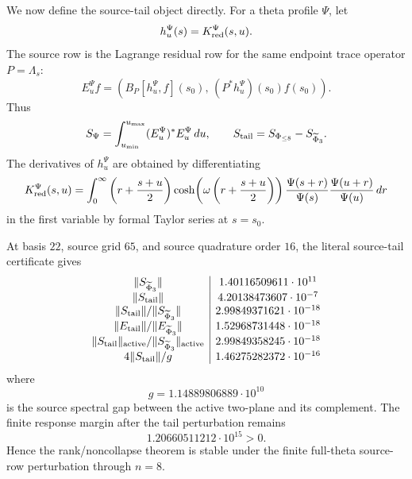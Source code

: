 \documentclass[11pt]{article}
\begin{document}
We now define the source-tail object directly.  For a theta profile \(\Psi\),
let
\[
  h_u^\Psi(s)=K_{\rm red}^\Psi(s,u).
\]
The source row is the Lagrange residual row for the same endpoint trace
operator \(P=\Lambda_s\):
\[
  E_u^\Psi f
  =
  \left(
    B_P[h_u^\Psi,f](s_0),\,
    (P^\ast h_u^\Psi)(s_0)f(s_0)
  \right).
\]
Thus
\[
  S_\Psi=\int_{u_{\min}}^{u_{\max}}(E_u^\Psi)^\ast E_u^\Psi\,du,
  \qquad
  S_{\rm tail}=S_{\Phi_{\le8}}-S_{\widetilde\Phi_3}.
\]
The derivatives of \(h_u^\Psi\) are obtained by differentiating
\[
K_{\rm red}^\Psi(s,u)
=
\int_0^\infty
\left(r+{s+u\over2}\right)
\cosh\!\left(\omega\left(r+{s+u\over2}\right)\right)
{\Psi(s+r)\over\Psi(s)}
{\Psi(u+r)\over\Psi(u)}\,dr
\]
in the first variable by formal Taylor series at \(s=s_0\).

At basis \(22\), source grid \(65\), and source quadrature order \(16\), the
literal source-tail certificate gives
\[
\begin{array}{c|c}
\|S_{\widetilde\Phi_3}\|&1.40116509611\cdot10^{11}\\
\|S_{\rm tail}\|&4.20138473607\cdot10^{-7}\\
\|S_{\rm tail}\|/\|S_{\widetilde\Phi_3}\|
  &2.99849371621\cdot10^{-18}\\
\|E_{\rm tail}\|/\|E_{\widetilde\Phi_3}\|
  &1.52968731448\cdot10^{-18}\\
\|S_{\rm tail}\|_{\rm active}/\|S_{\widetilde\Phi_3}\|_{\rm active}
  &2.99849358245\cdot10^{-18}\\
4\|S_{\rm tail}\|/g&1.46275282372\cdot10^{-16}
\end{array}
\]
where
\[
  g=1.14889806889\cdot10^{10}
\]
is the source spectral gap between the active two-plane and its complement.
The finite response margin after the tail perturbation remains
\[
  1.20660511212\cdot10^{15}>0.
\]
Hence the rank/noncollapse theorem is stable under the finite full-theta
source-row perturbation through \(n=8\).
\end{document}

